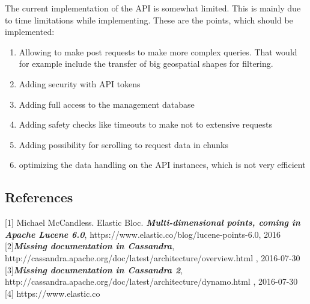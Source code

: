 The current implementation of the API is somewhat limited. This is
mainly due to time limitations while implementing. These are the points,
which should be implemented:

\begin{enumerate}
\def\labelenumi{\arabic{enumi}.}
\tightlist
\item
  Allowing to make post requests to make more complex queries. That
  would for example include the transfer of big geospatial shapes for
  filtering.
\item
  Adding security with API tokens
\item
  Adding full access to the management database
\item
  Adding safety checks like timeouts to make not to extensive requests
\item
  Adding possibility for scrolling to request data in chunks
\item
  optimizing the data handling on the API instances, which is not very
  efficient
\end{enumerate}

\subsection{References}\label{references}

{[}1{]} Michael McCandless. Elastic Bloc.
\textbf{\emph{Multi-dimensional points, coming in Apache Lucene 6.0}},
https://www.elastic.co/blog/lucene-points-6.0, 2016
{[}2{]}\textbf{\emph{Missing documentation in Cassandra}},
http://cassandra.apache.org/doc/latest/architecture/overview.html ,
2016-07-30 {[}3{]}\textbf{\emph{Missing documentation in Cassandra 2}},
http://cassandra.apache.org/doc/latest/architecture/dynamo.html ,
2016-07-30 {[}4{]} https://www.elastic.co
